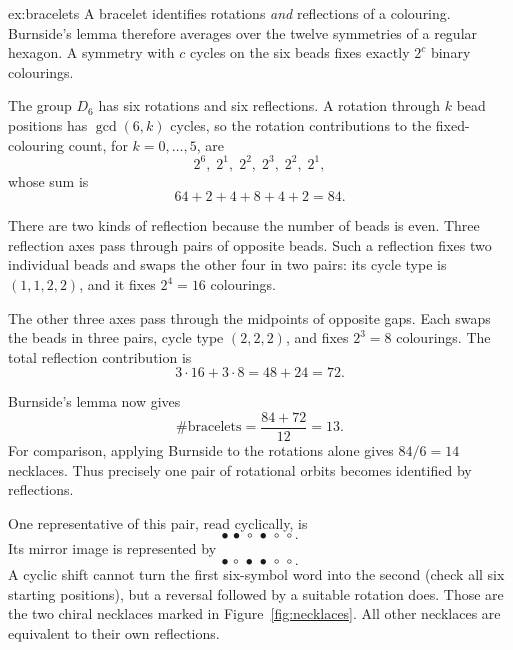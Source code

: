 \begin{solution}{ex:bracelets}
\idea A bracelet identifies rotations \emph{and} reflections of a colouring. Burnside's lemma therefore averages over the twelve symmetries of a regular hexagon. A symmetry with $c$ cycles on the six beads fixes exactly $2^c$ binary colourings.

\writeup The group $D_6$ has six rotations and six reflections. A rotation through $k$ bead positions has $\gcd(6,k)$ cycles, so the rotation contributions to the fixed-colouring count, for $k=0,\ldots,5$, are
\[
2^6,\;2^1,\;2^2,\;2^3,\;2^2,\;2^1,
\]
whose sum is
\[
64+2+4+8+4+2=84.
\]

There are two kinds of reflection because the number of beads is even. Three reflection axes pass through pairs of opposite beads. Such a reflection fixes two individual beads and swaps the other four in two pairs: its cycle type is $(1,1,2,2)$, and it fixes $2^4=16$ colourings.

The other three axes pass through the midpoints of opposite gaps. Each swaps the beads in three pairs, cycle type $(2,2,2)$, and fixes $2^3=8$ colourings. The total reflection contribution is
\[
3\cdot16+3\cdot8=48+24=72.
\]

Burnside's lemma now gives
\[
\boxed{\#\text{bracelets}=\frac{84+72}{12}=13}.
\]
For comparison, applying Burnside to the rotations alone gives $84/6=14$ necklaces. Thus precisely one pair of rotational orbits becomes identified by reflections.

One representative of this pair, read cyclically, is
\[
\bullet\,\bullet\,\circ\,\bullet\,\circ\,\circ.
\]
Its mirror image is represented by
\[
\bullet\,\circ\,\bullet\,\bullet\,\circ\,\circ.
\]
A cyclic shift cannot turn the first six-symbol word into the second (check all six starting positions), but a reversal followed by a suitable rotation does. Those are the two chiral necklaces marked in Figure~\ref{fig:necklaces}. All other necklaces are equivalent to their own reflections.
\end{solution}

